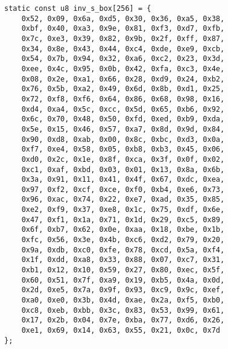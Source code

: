 \newpage
\begin{lstlisting}[style=C, caption={},captionpos=t]
static const u8 inv_s_box[256] = {
	0x52, 0x09, 0x6a, 0xd5, 0x30, 0x36, 0xa5, 0x38,
	0xbf, 0x40, 0xa3, 0x9e, 0x81, 0xf3, 0xd7, 0xfb,
	0x7c, 0xe3, 0x39, 0x82, 0x9b, 0x2f, 0xff, 0x87,
	0x34, 0x8e, 0x43, 0x44, 0xc4, 0xde, 0xe9, 0xcb,
	0x54, 0x7b, 0x94, 0x32, 0xa6, 0xc2, 0x23, 0x3d,
	0xee, 0x4c, 0x95, 0x0b, 0x42, 0xfa, 0xc3, 0x4e,
	0x08, 0x2e, 0xa1, 0x66, 0x28, 0xd9, 0x24, 0xb2,
	0x76, 0x5b, 0xa2, 0x49, 0x6d, 0x8b, 0xd1, 0x25,
	0x72, 0xf8, 0xf6, 0x64, 0x86, 0x68, 0x98, 0x16,
	0xd4, 0xa4, 0x5c, 0xcc, 0x5d, 0x65, 0xb6, 0x92,
	0x6c, 0x70, 0x48, 0x50, 0xfd, 0xed, 0xb9, 0xda,
	0x5e, 0x15, 0x46, 0x57, 0xa7, 0x8d, 0x9d, 0x84,
	0x90, 0xd8, 0xab, 0x00, 0x8c, 0xbc, 0xd3, 0x0a,
	0xf7, 0xe4, 0x58, 0x05, 0xb8, 0xb3, 0x45, 0x06,
	0xd0, 0x2c, 0x1e, 0x8f, 0xca, 0x3f, 0x0f, 0x02,
	0xc1, 0xaf, 0xbd, 0x03, 0x01, 0x13, 0x8a, 0x6b,
	0x3a, 0x91, 0x11, 0x41, 0x4f, 0x67, 0xdc, 0xea,
	0x97, 0xf2, 0xcf, 0xce, 0xf0, 0xb4, 0xe6, 0x73,
	0x96, 0xac, 0x74, 0x22, 0xe7, 0xad, 0x35, 0x85,
	0xe2, 0xf9, 0x37, 0xe8, 0x1c, 0x75, 0xdf, 0x6e,
	0x47, 0xf1, 0x1a, 0x71, 0x1d, 0x29, 0xc5, 0x89,
	0x6f, 0xb7, 0x62, 0x0e, 0xaa, 0x18, 0xbe, 0x1b,
	0xfc, 0x56, 0x3e, 0x4b, 0xc6, 0xd2, 0x79, 0x20,
	0x9a, 0xdb, 0xc0, 0xfe, 0x78, 0xcd, 0x5a, 0xf4,
	0x1f, 0xdd, 0xa8, 0x33, 0x88, 0x07, 0xc7, 0x31,
	0xb1, 0x12, 0x10, 0x59, 0x27, 0x80, 0xec, 0x5f,
	0x60, 0x51, 0x7f, 0xa9, 0x19, 0xb5, 0x4a, 0x0d,
	0x2d, 0xe5, 0x7a, 0x9f, 0x93, 0xc9, 0x9c, 0xef,
	0xa0, 0xe0, 0x3b, 0x4d, 0xae, 0x2a, 0xf5, 0xb0,
	0xc8, 0xeb, 0xbb, 0x3c, 0x83, 0x53, 0x99, 0x61,
	0x17, 0x2b, 0x04, 0x7e, 0xba, 0x77, 0xd6, 0x26,
	0xe1, 0x69, 0x14, 0x63, 0x55, 0x21, 0x0c, 0x7d
};
\end{lstlisting}

